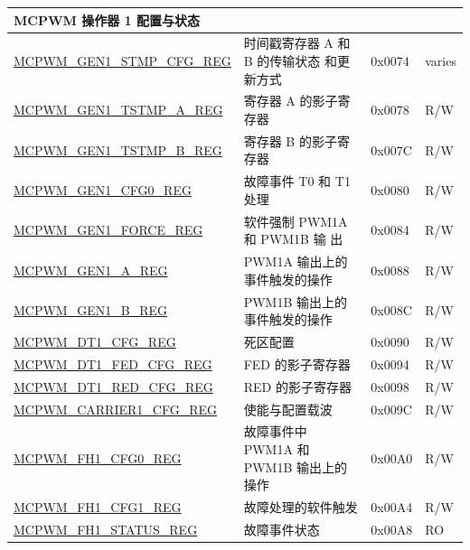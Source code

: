 \begin{longtable}{ | p{6cm} | p{7.2cm} | p{1.2cm} | p{1cm} | }
\multicolumn{4}{|l|}{\textbf{MCPWM 操作器 1 配置与状态}} \\ \hline
\hyperref[regdesc:MCPWMGENNSTMPCFGREG]{MCPWM\_GEN1\_STMP\_CFG\_REG} & 时间戳寄存器 A 和 B 的传输状态 和更新方式 & 0x0074 & varies\\ \hline
\hyperref[regdesc:MCPWMGENNTSTMPAREG]{MCPWM\_GEN1\_TSTMP\_A\_REG} & 寄存器 A 的影子寄存器 & 0x0078 &  R/W \\ \hline
\hyperref[regdesc:MCPWMGENNTSTMPBREG]{MCPWM\_GEN1\_TSTMP\_B\_REG} & 寄存器 B 的影子寄存器 & 0x007C & R/W \\ \hline
\hyperref[regdesc:MCPWMGENNCFG0REG]{MCPWM\_GEN1\_CFG0\_REG} & 故障事件 T0 和 T1 处理 &  0x0080 &  R/W \\ \hline
\hyperref[regdesc:MCPWMGENNFORCEREG]{MCPWM\_GEN1\_FORCE\_REG} & 软件强制 PWM1A 和 PWM1B 输 出 &  0x0084 & R/W \\ \hline
\hyperref[regdesc:MCPWMGENNAREG]{MCPWM\_GEN1\_A\_REG} & PWM1A 输出上的事件触发的操作 & 0x0088 &  R/W \\ \hline
\hyperref[regdesc:MCPWMGENNBREG]{MCPWM\_GEN1\_B\_REG} & PWM1B 输出上的事件触发的操作 & 0x008C & R/W \\ \hline
\hyperref[regdesc:MCPWMDTNCFGREG]{MCPWM\_DT1\_CFG\_REG} & 死区配置  & 0x0090  & R/W \\ \hline
\hyperref[regdesc:MCPWMDTNFEDCFGREG]{MCPWM\_DT1\_FED\_CFG\_REG} & FED 的影子寄存器 & 0x0094 & R/W \\ \hline
\hyperref[regdesc:MCPWMDTNREDCFGREG]{MCPWM\_DT1\_RED\_CFG\_REG} & RED 的影子寄存器 & 0x0098 & R/W \\ \hline
\hyperref[regdesc:MCPWMCARRIERNCFGREG]{MCPWM\_CARRIER1\_CFG\_REG} & 使能与配置载波 & 0x009C & R/W \\ \hline
\hyperref[regdesc:MCPWMFHNCFG0REG]{MCPWM\_FH1\_CFG0\_REG} & 故障事件中 PWM1A 和 PWM1B 输出上的操作 & 0x00A0 & R/W \\ \hline
\hyperref[regdesc:MCPWMFHNCFG1REG]{MCPWM\_FH1\_CFG1\_REG} & 故障处理的软件触发 & 0x00A4 &  R/W \\ \hline
\hyperref[regdesc:MCPWMFHNSTATUSREG]{MCPWM\_FH1\_STATUS\_REG} & 故障事件状态 &0x00A8 & RO \\ \hline


\end{longtable}
